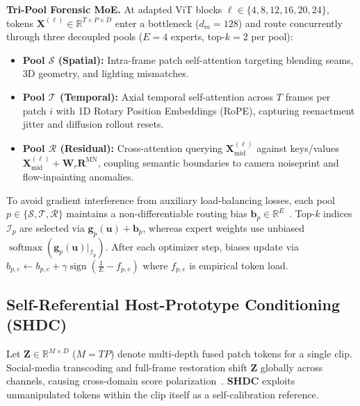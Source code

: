 \documentclass[10pt,twocolumn]{article}
\begin{document}
\noindent\textbf{Tri-Pool Forensic MoE.} At adapted ViT blocks $\ell \in \{4,8,12,16,20,24\}$, tokens $\mathbf{X}^{(\ell)} \in \mathbb{R}^{T\times P\times D}$ enter a bottleneck ($d_m=128$) and route concurrently through three decoupled pools ($E=4$ experts, top-$k=2$ per pool):
\begin{itemize}[leftmargin=1.3em,itemsep=0.5pt,topsep=1pt]
    \item \textbf{Pool $\mathcal{S}$ (Spatial):} Intra-frame patch self-attention targeting blending seams, 3D geometry, and lighting mismatches.
    \item \textbf{Pool $\mathcal{T}$ (Temporal):} Axial temporal self-attention across $T$ frames per patch $i$ with 1D Rotary Position Embeddings (RoPE), capturing reenactment jitter and diffusion rollout resets.
    \item \textbf{Pool $\mathcal{R}$ (Residual):} Cross-attention querying $\mathbf{X}_{\text{mid}}^{(\ell)}$ against keys/values $\mathbf{X}_{\text{mid}}^{(\ell)} + \mathbf{W}_r \mathbf{R}^{\text{MN}}$, coupling semantic boundaries to camera noiseprint and flow-inpainting anomalies.
\end{itemize}
To avoid gradient interference from auxiliary load-balancing losses, each pool $p \in \{\mathcal{S},\mathcal{T},\mathcal{R}\}$ maintains a non-differentiable routing bias $\mathbf{b}_p \in \mathbb{R}^E$~\cite{deepseek2024v3,moste2026}. Top-$k$ indices $\mathcal{I}_p$ are selected via $\mathbf{g}_p(\mathbf{u}) + \mathbf{b}_p$, whereas expert weights use unbiased $\operatorname{softmax}(\mathbf{g}_p(\mathbf{u})|_{\mathcal{I}_p})$. After each optimizer step, biases update via $b_{p,e} \leftarrow b_{p,e} + \gamma \operatorname{sign}(\frac{1}{E} - f_{p,e})$ where $f_{p,e}$ is empirical token load.

\subsection{Self-Referential Host-Prototype Conditioning (SHDC)}
\label{subsec:shdc}
Let $\mathbf{Z} \in \mathbb{R}^{M \times D}$ ($M=TP$) denote multi-depth fused patch tokens for a single clip. Social-media transcoding and full-frame restoration shift $\mathbf{Z}$ globally across channels, causing cross-domain score polarization~\cite{nguyen2026whenaucmisleads}. \textbf{SHDC} exploits unmanipulated tokens within the clip itself as a self-calibration reference.
\end{document}
